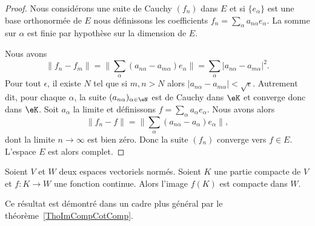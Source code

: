 \begin{proof}
    Nous considérons une suite de Cauchy \( (f_n)\) dans \( E\) et si \( \{ e_{\alpha} \} \) est une base orthonormée de \( E\) nous définissons les coefficients \( f_n=\sum_{\alpha}a_{n\alpha}e_{\alpha} \). La somme sur \( \alpha\) est finie par hypothèse sur la dimension de \( E\).

    Nous avons
    \begin{equation}
        \| f_n-f_m \|=\| \sum_{\alpha}(a_{n\alpha}-a_{m\alpha})e_{\alpha} \|=\sum_{\alpha}| a_{n\alpha}-a_{m\alpha} |^2.
    \end{equation}
    Pour tout \( \epsilon\), il existe \( N\) tel que si \( m,n>N\) alors \( | a_{n\alpha}-a_{m\alpha} |<\sqrt{ \epsilon }\). Autrement dit, pour chaque \( \alpha\), la suite \( (a_{n\alpha})_{\alpha\in \eN}\) est de Cauchy dans \( \eK\) et converge donc dans \( \eK\). Soit \( a_{\alpha}\) la limite et définissons \( f=\sum_{\alpha}a_{\alpha}e_{\alpha}\). Nous avons alors
    \begin{equation}
        \| f_n-f \|=\| \sum_{\alpha}(a_{n\alpha}-a_{\alpha})e_{\alpha} \|,
    \end{equation}
    dont la limite \( n\to \infty\) est bien zéro. Donc la suite \( (f_n)\) converge vers \( f\in E\). L'espace \( E\) est alors complet.
\end{proof}




\begin{proposition}		\label{PropContinueCompactBorne}
	Soient $V$ et $W$ deux espaces vectoriels normés. Soient $K$ une partie compacte de $V$ et $f\colon K\to W$ une fonction continue. Alors l'image $f(K)$ est compacte dans $W$.
\end{proposition}
Ce résultat est démontré dans un cadre plus général par le théorème~\ref{ThoImCompCotComp}.

